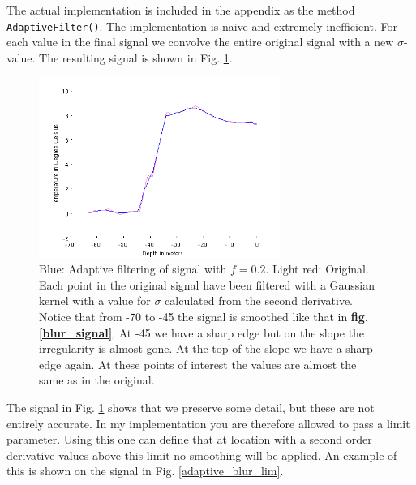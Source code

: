 \documentclass[a4paper, 10pt, final]{article}
\begin{document}
The actual implementation is included in the appendix as the method
\texttt{AdaptiveFilter()}. The implementation is naive and extremely
inefficient. For each value in the final signal we convolve the entire
original signal with a new $\sigma$-value. The resulting signal is shown
in Fig. \ref{adaptive_blur}.

\begin{figure}[!h]
    \centering
    \includegraphics[angle=0,width=0.7\textwidth]{images/adaptive_blur}
    \caption[]{Blue: Adaptive filtering of signal with $f = 0.2$. Light
    red: Original.  Each point in the original signal have been filtered
    with a Gaussian kernel with a value for $\sigma$ calculated from the
    second derivative. Notice that from -70 to -45 the signal is
    smoothed like that in \textbf{fig.  \ref{blur_signal}}. At -45 we
    have a sharp edge but on the slope the irregularity is almost gone.
    At the top of the slope we have a sharp edge again. At these points
    of interest the values are almost the same as in the original.}
    \label{adaptive_blur}
\end{figure}

The signal in Fig. \ref{adaptive_blur} shows that we preserve some
detail, but these are not entirely accurate. In my implementation you
are therefore allowed to pass a limit parameter. Using this one can
define that at location with a second order derivative values above this
limit no smoothing will be applied. An example of this is shown on the
signal in Fig. \ref{adaptive_blur_lim}.
\end{document}
